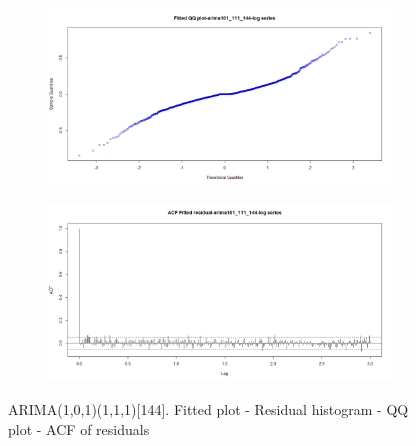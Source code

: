 \documentclass[12pt]{article}
\begin{document}
\begin{figure}[H]
\begin{subfigure}[b]{0.6\linewidth}
    \includegraphics[width=\linewidth]{figure15-3.png}
  \end{subfigure}
  \begin{subfigure}[b]{0.6\linewidth}
    \includegraphics[width=\linewidth]{figure15-4.png}
  \end{subfigure}
  \caption{ARIMA(1,0,1)(1,1,1)[144]. Fitted plot - Residual histogram - QQ plot - ACF of residuals}
  \label{fig:figure15}
\end{figure}
\end{document}
